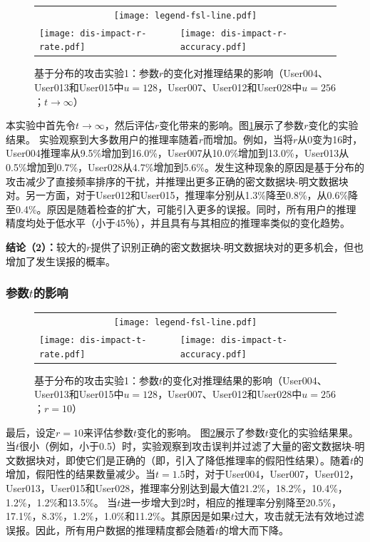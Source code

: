 \begin{figure}[!htbp]
    \centering
    \begin{tabular}{p{.48\linewidth}p{.48\linewidth}}
        \multicolumn{2}{c}{\texttt{[image: legend-fsl-line.pdf]}}  \\
        \texttt{[image: dis-impact-r-rate.pdf]} &
        \texttt{[image: dis-impact-r-accuracy.pdf]}\\
    \end{tabular}
    \caption{基于分布的攻击实验1：参数$r$的变化对推理结果的影响（User004、User013和User015中$u = 128$，User007、User012和User028中$u = 256$；$t \rightarrow \infty$）}
    \label{fig:distribution-impact-r}
\end{figure}

本实验中首先令$t\rightarrow \infty$，然后评估$r$变化带来的影响。图\ref{fig:distribution-impact-r}展示了参数$r$变化的实验结果。 实验观察到大多数用户的推理率随着$r$而增加。例如，当将$r$从0变为16时，User004推理率从9.5\%增加到16.0\%，User007从10.0\%增加到13.0\%，User013从0.5\%增加到0.7\%，User028从4.7\%增加到5.6\%。发生这种现象的原因是基于分布的攻击减少了直接频率排序的干扰，并推理出更多正确的密文数据块-明文数据块对。另一方面，对于User012和User015，推理率分别从1.3\%降至0.8\%，从0.6\%降至0.4\%。原因是随着检查的扩大，可能引入更多的误报。同时，所有用户的推理精度均处于低水平（小于45％），并且具有与其相应的推理率类似的变化趋势。


\textbf{结论（2）：}较大的$r$提供了识别正确的密文数据块-明文数据块对的更多机会，但也增加了发生误报的概率。
\subsubsection{参数$t$的影响}

\begin{figure}[!ht]
    \centering
    \begin{tabular}{p{.48\linewidth}p{.48\linewidth}}
        \multicolumn{2}{c}{\texttt{[image: legend-fsl-line.pdf]}}  \\
        \texttt{[image: dis-impact-t-rate.pdf]} &
        \texttt{[image: dis-impact-t-accuracy.pdf]}\\
    \end{tabular}
    \caption{基于分布的攻击实验1：参数$t$的变化对推理结果的影响（User004、User013和User015中$u = 128$，User007、User012和User028中$u = 256$；$r = 10$）}
    \label{fig:distribution-impact-t}
\end{figure}

最后，设定$r=10$来评估参数$t$变化的影响。 图\ref{fig:distribution-impact-t}展示了参数$t$变化的实验结果果。当$t$很小（例如，小于0.5）时，实验观察到攻击误判并过滤了大量的密文数据块-明文数据块对，即使它们是正确的（即，引入了降低推理率的假阳性结果）。随着$t$的增加，假阳性的结果数量减少。当$t= 1.5$时，对于User004，User007，User012，User013，User015和User028，推理率分别达到最大值21.2\%，18.2\%，10.4\%，1.2\%，1.2\%和13.5\%。 当$t$进一步增大到2时，相应的推理率分别降至20.5\%，17.1\%，8.3\%，1.2\%，1.0\%和11.2\%。其原因是如果$t$过大，攻击就无法有效地过滤误报。因此，所有用户数据的推理精度都会随着$t$的增大而下降。

